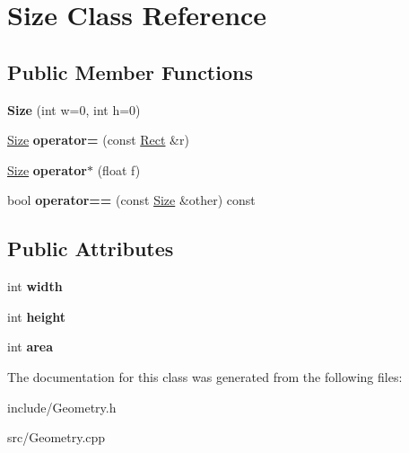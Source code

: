 \hypertarget{classSize}{}\section{Size Class Reference}
\label{classSize}
\subsection*{Public Member Functions}
\begin{DoxyCompactItemize}
\item 
\hypertarget{classSize_a0ea0a7599bb78efd82b1a15d2bf99949}{}{\bfseries Size} (int w=0, int h=0)\label{classSize_a0ea0a7599bb78efd82b1a15d2bf99949}

\item 
\hypertarget{classSize_a1afcc84f430e6034f296f0b167f76d51}{}\hyperlink{classSize}{Size} {\bfseries operator=} (const \hyperlink{classRect}{Rect} \&r)\label{classSize_a1afcc84f430e6034f296f0b167f76d51}

\item 
\hypertarget{classSize_ac806d63f500f065ce5eddfaaf8b0bb07}{}\hyperlink{classSize}{Size} {\bfseries operator$\ast$} (float f)\label{classSize_ac806d63f500f065ce5eddfaaf8b0bb07}

\item 
\hypertarget{classSize_a11cb27cff6cc1767a76fec0e1f5dd4d2}{}bool {\bfseries operator==} (const \hyperlink{classSize}{Size} \&other) const \label{classSize_a11cb27cff6cc1767a76fec0e1f5dd4d2}

\end{DoxyCompactItemize}
\subsection*{Public Attributes}
\begin{DoxyCompactItemize}
\item 
\hypertarget{classSize_aa1f23158085de487cfd5434301c077a4}{}int {\bfseries width}\label{classSize_aa1f23158085de487cfd5434301c077a4}

\item 
\hypertarget{classSize_a4cdfe2d67b3f87b3f5d86bfafd5df036}{}int {\bfseries height}\label{classSize_a4cdfe2d67b3f87b3f5d86bfafd5df036}

\item 
\hypertarget{classSize_a9603965bb9c8fd9fc0ae651412b2a3e0}{}int {\bfseries area}\label{classSize_a9603965bb9c8fd9fc0ae651412b2a3e0}

\end{DoxyCompactItemize}


The documentation for this class was generated from the following files\+:\begin{DoxyCompactItemize}
\item 
include/Geometry.\+h\item 
src/Geometry.\+cpp\end{DoxyCompactItemize}
